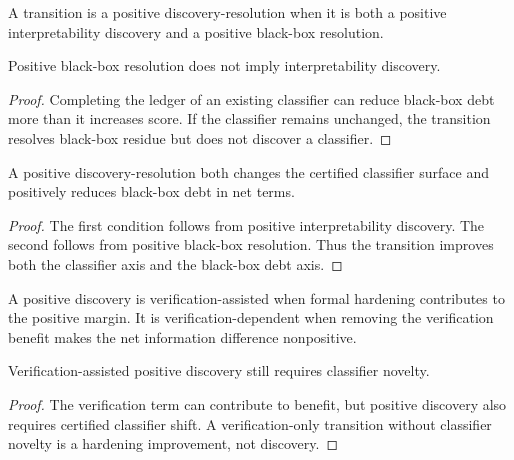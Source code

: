 \begin{definition}
\label{def:philosophy-positive-discovery-resolution}
A transition is a positive discovery-resolution when it is both a
positive interpretability discovery and a positive black-box resolution.
\end{definition}

\begin{theorem}
\label{thm:philosophy-positive-black-box-resolution-not-discovery}
Positive black-box resolution does not imply interpretability discovery.
\end{theorem}
\begin{proof}
Completing the ledger of an existing classifier can reduce black-box debt
more than it increases score. If the classifier remains unchanged, the
transition resolves black-box residue but does not discover a classifier.
\end{proof}

\begin{theorem}
\label{thm:philosophy-positive-discovery-resolution-strongest}
A positive discovery-resolution both changes the certified classifier
surface and positively reduces black-box debt in net terms.
\end{theorem}
\begin{proof}
The first condition follows from positive interpretability discovery.
The second follows from positive black-box resolution. Thus the
transition improves both the classifier axis and the black-box debt axis.
\end{proof}

\begin{definition}
\label{def:philosophy-verification-assisted-positive-discovery}
A positive discovery is verification-assisted when formal hardening
contributes to the positive margin. It is verification-dependent when
removing the verification benefit makes the net information difference
nonpositive.
\end{definition}

\begin{theorem}
\label{thm:philosophy-verification-assistance-not-replace-novelty}
Verification-assisted positive discovery still requires classifier
novelty.
\end{theorem}
\begin{proof}
The verification term can contribute to benefit, but positive discovery
also requires certified classifier shift. A verification-only transition
without classifier novelty is a hardening improvement, not discovery.
\end{proof}


